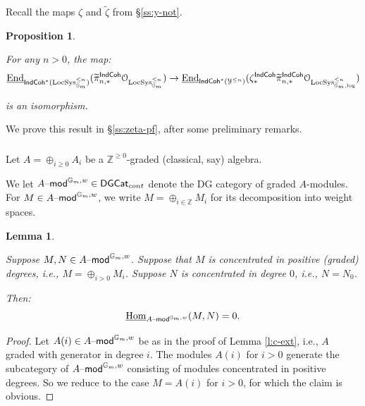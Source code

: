 \documentclass[reqno,11pt]{amsart}
\numberwithin{equation}{subsection}
\newtheorem{lem}[thm]{Lemma}
\newtheorem{prop}[thm]{Proposition}
\theoremstyle{remark}
\newcommand{\bG}{{\mathbb G}}
\newcommand{\bZ}{{\mathbb Z}}
\newcommand{\sO}{{\EuScript O}}
\newcommand{\sY}{{\EuScript Y}}
\newcommand{\on}{\operatorname}
\newcommand{\ul}{\underline}
\newcommand{\mathendash}{\text{\textendash}}
\newcommand{\End}{\on{End}}
\newcommand{\Hom}{\on{Hom}}
\newcommand{\LocSys}{\on{LocSys}}
\renewcommand{\mod}{\mathendash\mathsf{mod}}
\newcommand{\DGCat}{\mathsf{DGCat}}
\newcommand{\IndCoh}{\mathsf{IndCoh}}
\begin{document}
Recall the maps $\zeta$ and $\widetilde{\zeta}$ from \S \ref{ss:y-not}.

\begin{prop}\label{p:zeta}

For any $n > 0$, the map:
%
\[
\ul{\End}_{\IndCoh^*(\LocSys_{\bG_m}^{\leq n})}(
\widetilde{\pi}_{n,*}^{\IndCoh}\sO_{\LocSys_{\bG_m}^{\leq n}}) \to 
\ul{\End}_{\IndCoh^*(\sY^{\leq n})}(
\zeta_*^{\IndCoh}\widetilde{\pi}_{n,*}^{\IndCoh}
\sO_{\LocSys_{\bG_m,\log}^{\leq n}}) 
\]

\noindent is an isomorphism.

\end{prop}

We prove this result in \S \ref{ss:zeta-pf}, after some 
preliminary remarks.

\subsubsection{}

Let $A = \oplus_{i \geq 0} A_i $ be a 
$\bZ^{\geq 0}$-graded (classical, say) algebra.

We let $A\mod^{\bG_m,w} \in \DGCat_{cont}$ denote the 
DG category of graded $A$-modules. For $M \in A\mod^{\bG_m,w}$,
we write $M = \oplus_{i \in \bZ} M_i$ for its
decomposition into weight spaces.

\begin{lem}\label{l:gr-hom}

Suppose $M,N \in A\mod^{\bG_m,w}$. Suppose that 
$M$ is concentrated in positive (graded) degrees,
i.e., $M = \oplus_{i>0} M_i$. Suppose $N$ is concentrated
in degree $0$, i.e., $N = N_0$.

Then:
%
\[
\ul{\Hom}_{A\mod^{\bG_m,w}}(M,N) = 0.
\]

\end{lem}

\begin{proof}

Let $A(i) \in A\mod^{\bG_m,w}$ be as in the proof of Lemma \ref{l:c-ext}, i.e.,
$A$ graded with generator in degree $i$. The modules $A(i)$ for $i > 0$ 
generate the subcategory of $A\mod^{\bG_m,w}$ consisting of modules concentrated
in positive degrees. So we reduce to the case $M = A(i)$ for $i>0$, for which the claim is obvious.
	
\end{proof}

\subsubsection{}
\end{document}
